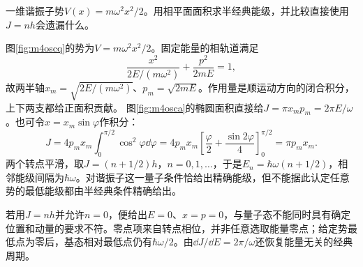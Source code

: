 \begin{example}\label{ex:m4osc}
一维谐振子势$V(x)=m\omega^2x^2/2$。用相平面面积求半经典能级，并比较直接使用$J=nh$会遗漏什么。
\end{example}
\begin{solution}
图\ref{fig:m4oscq}的势为$V=m\omega^2x^2/2$。固定能量的相轨道满足
\[
 \frac{x^2}{2E/(m\omega^2)}+\frac{p^2}{2mE}=1,
\]
故两半轴$x_m=\sqrt{2E/(m\omega^2)}$、$p_m=\sqrt{2mE}$。作用量是顺运动方向的闭合积分，上下两支都给正面积贡献。
图\ref{fig:m4osca}的椭圆面积直接给$J=\pi x_mp_m=2\pi E/\omega$。也可令$x=x_m\sin\varphi$作积分：
\[
 J=4p_mx_m\int_0^{\pi/2}\cos^2\varphi\dd\varphi
 =4p_mx_m\left[\frac\varphi2+\frac{\sin2\varphi}{4}\right]_0^{\pi/2}
 =\pi p_mx_m.
\]
两个转点平滑，取$J=(n+1/2)h$，$n=0,1,\ldots$，于是$E_n=\hbar\omega(n+1/2)$，相邻能级间隔为$\hbar\omega$。对谐振子这一量子条件恰给出精确能级，但不能据此认定任意势的最低能级都由半经典条件精确给出。

若用$J=nh$并允许$n=0$，便给出$E=0$、$x=p=0$，与量子态不能同时具有确定位置和动量的要求不符。零点项来自转点相位，并非任意选取能量零点；给定势最低点为零后，基态相对最低点仍有$\hbar\omega/2$。由$\dd J/\dd E=2\pi/\omega$还恢复能量无关的经典周期。
\end{solution}

